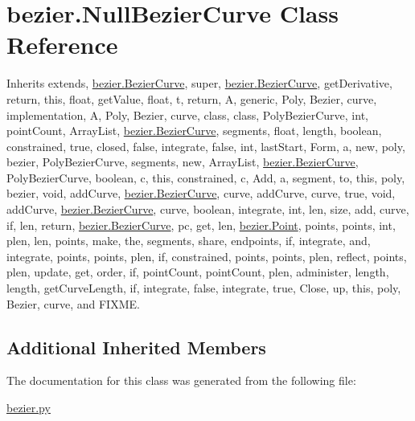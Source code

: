 \hypertarget{classbezier_1_1_null_bezier_curve}{}\section{bezier.\+Null\+Bezier\+Curve Class Reference}
\label{classbezier_1_1_null_bezier_curve}


Inherits extends, \hyperlink{classbezier_1_1_bezier_curve}{bezier.\+Bezier\+Curve}, super, \hyperlink{classbezier_1_1_bezier_curve}{bezier.\+Bezier\+Curve}, get\+Derivative, return, this, float, get\+Value, float, t, return, A, generic, Poly, Bezier, curve, implementation, A, Poly, Bezier, curve, class, class, Poly\+Bezier\+Curve, int, point\+Count, Array\+List, \hyperlink{classbezier_1_1_bezier_curve}{bezier.\+Bezier\+Curve}, segments, float, length, boolean, constrained, true, closed, false, integrate, false, int, last\+Start, Form, a, new, poly, bezier, Poly\+Bezier\+Curve, segments, new, Array\+List, \hyperlink{classbezier_1_1_bezier_curve}{bezier.\+Bezier\+Curve}, Poly\+Bezier\+Curve, boolean, c, this, constrained, c, Add, a, segment, to, this, poly, bezier, void, add\+Curve, \hyperlink{classbezier_1_1_bezier_curve}{bezier.\+Bezier\+Curve}, curve, add\+Curve, curve, true, void, add\+Curve, \hyperlink{classbezier_1_1_bezier_curve}{bezier.\+Bezier\+Curve}, curve, boolean, integrate, int, len, size, add, curve, if, len, return, \hyperlink{classbezier_1_1_bezier_curve}{bezier.\+Bezier\+Curve}, pc, get, len, \hyperlink{classbezier_1_1_point}{bezier.\+Point}, points, points, int, plen, len, points, make, the, segments, share, endpoints, if, integrate, and, integrate, points, points, plen, if, constrained, points, points, plen, reflect, points, plen, update, get, order, if, point\+Count, point\+Count, plen, administer, length, length, get\+Curve\+Length, if, integrate, false, integrate, true, Close, up, this, poly, Bezier, curve, and F\+I\+X\+M\+E.

\subsection*{Additional Inherited Members}


The documentation for this class was generated from the following file\+:\begin{DoxyCompactItemize}
\item 
\hyperlink{bezier_8py}{bezier.\+py}\end{DoxyCompactItemize}
